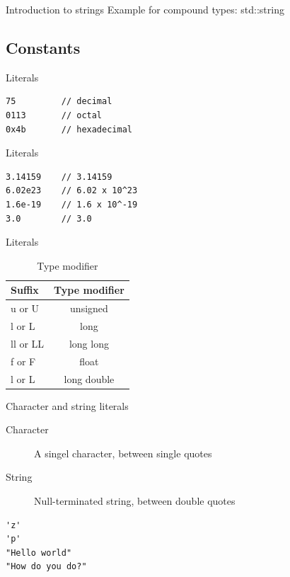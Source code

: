 \documentclass{beamer}
\begin{document}
\begin{frame}{Introduction to strings}
Example for compound types: std::string



\end{frame}


\subsection{Constants}

\begin{frame}[fragile]{Literals}

\begin{lstlisting}[caption=Integer Numerals]
75         // decimal
0113       // octal
0x4b       // hexadecimal
\end{lstlisting}

\end{frame}

\begin{frame}[fragile]{Literals}

\begin{lstlisting}[caption=Floating Point Numerals]
3.14159    // 3.14159
6.02e23    // 6.02 x 10^23
1.6e-19    // 1.6 x 10^-19
3.0        // 3.0
\end{lstlisting}

\end{frame}

\begin{frame}{Literals}
\begin{table}
\begin{tabular}{l | c}
Suffix & Type modifier \\
\hline
u or U & unsigned \\
l or L & long \\
ll or LL & long long \\
f or F & float \\
l or L & long double
\end{tabular}
\caption{Type modifier}
\end{table}

\end{frame}

\begin{frame}[fragile]{Character and string literals}
\begin{description}
\item[Character] A singel character, between single quotes
\item[String] Null-terminated string, between double quotes 
\end{description}
\begin{lstlisting}[caption=Character and string literals]
'z'
'p'
"Hello world"
"How do you do?"
\end{lstlisting}

\end{frame}
\end{document}
